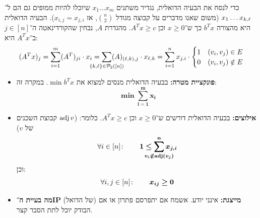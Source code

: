 \documentclass[]{../../../../tex/classes/homework}
\begin{document}
\begin{enumerate}[(A)]
		כדי לנסח את הבעיה הדואלית, נגדיר משתנים $x_1 \dots x_{m}$ שיוכלו להיות ממופים גם הם ל־$x_1 \dots x_{k, \ell}$ (משום שאנו מדברים על קבוצה מגודל $\binom{n}{2}$, אז $x_{i,j} = x_{j,i}$). הבעיה הדואלית היא מהצורה $b^Tx$ כך ש־$x \ge 0$ וכן $A^Tx \ge c$. מהגדרת $A$, נבחין שהקורדינאטה ה־$j \in [n]$ ב־$A^Tx$ היא: 
		\[ (A^{T}x)_j = \sum_{i = 1}^{m}(A^{T})_{ji} \cdot x_i = \sum_{\mathclap{\{k, \ml\} \in \ps_2([n])}}(A)_{(\ml, k), j} \cdot x_{\ml, k} = \sum_{i = 1}^{n}x_{j, i} \cdot \begin{cases}
			1 & (v_i, v_j) \in E \\
			0 & (v_i, v_j) \notin E
		\end{cases} \]
		\begin{itemize}
			\item \textbf{פונקציית מטרה: }בבעיה הדואלית מנסים למצוא את $\min b^T x$. במקרה זה: 
			\[ \bm{\min \sum_{i =1}^{m}x_i} \]
			\item \textbf{אילוצים: }בבעיה הדואלית דורשים ש־$x \ge 0$ וכן $A^Tx \ge c$. כלומר: ($\operatorname{adj} v$ קבוצת השכנים של $v$)
			\[ \forall i \in [n] \co \quad\quad \bm{1\le \sum_{\mathclap{v_i \notin \adj(v_j)}}^{n}x_{j, i}} \]
			וכן: 
			\[ \forall i, j \in [n] \colon \quad\quad \bm{x_{ij} \ge 0} \]
			\item \textbf{מה בעיית ה־IP} (של הדואל) \textbf{מייצגת: }אינני יודע. אשמח אם יתפרסם פתרון או אם הבודק יוכל לתת הסבר קצר. 
		\end{itemize}
	\end{enumerate}
	
	\npage
	
\end{document}
